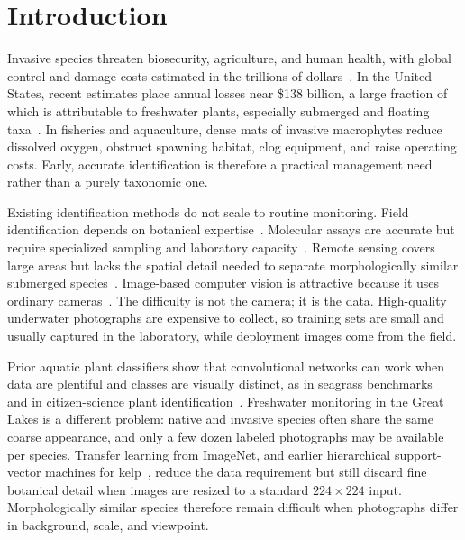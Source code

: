 \documentclass[final,3p,times,twocolumn]{elsarticle}
\begin{document}
\section{Introduction}
\label{sec:intro}

Invasive species threaten biosecurity, agriculture, and human health, with global control and damage costs estimated in the trillions of dollars~\cite{tasker2024nuanced, macedo2024economic, shen2024typical, vaissiere2022nature, cuthbert2021global}. In the United States, recent estimates place annual losses near \$138 billion, a large fraction of which is attributable to freshwater plants, especially submerged and floating taxa~\cite{pimentel2000environmental, lovell2006economic, warziniack2021economics, macedo2024economic}. In fisheries and aquaculture, dense mats of invasive macrophytes reduce dissolved oxygen, obstruct spawning habitat, clog equipment, and raise operating costs. Early, accurate identification is therefore a practical management need rather than a purely taxonomic one.

Existing identification methods do not scale to routine monitoring. Field identification depends on botanical expertise~\cite{dehez2023investigation}. Molecular assays are accurate but require specialized sampling and laboratory capacity~\cite{angles2019detection, ghahramanzadeh2013efficient, scriver2015development}. Remote sensing covers large areas but lacks the spatial detail needed to separate morphologically similar submerged species~\cite{brooks2019implementing, unitis2018remote, jochems4883509active}. Image-based computer vision is attractive because it uses ordinary cameras~\cite{wang2026realtime}. The difficulty is not the camera; it is the data. High-quality underwater photographs are expensive to collect, so training sets are small and usually captured in the laboratory, while deployment images come from the field.

Prior aquatic plant classifiers show that convolutional networks can work when data are plentiful and classes are visually distinct, as in seagrass benchmarks~\cite{DeepSeaGrass1, Nawaz2025Seagrass, Paul2023LWDS, baos_cnn} and in citizen-science plant identification~\cite{joly2016plantnet}. Freshwater monitoring in the Great Lakes is a different problem: native and invasive species often share the same coarse appearance, and only a few dozen labeled photographs may be available per species. Transfer learning from ImageNet, and earlier hierarchical support-vector machines for kelp~\cite{Kelps_SVMs}, reduce the data requirement but still discard fine botanical detail when images are resized to a standard $224\times 224$ input. Morphologically similar species therefore remain difficult when photographs differ in background, scale, and viewpoint.
\end{document}
